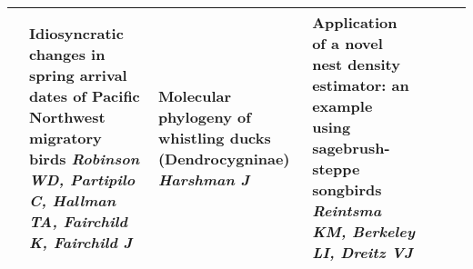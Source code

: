 \begin{tabular}{|x{0.75cm}|x{2.25cm}|x{2.25cm}|x{2.25cm}|a{2.25cm}|a{2.25cm}|a{2.25cm}|}
\hline
{}&Idiosyncratic changes in spring arrival dates of Pacific Northwest migratory birds \newline \newline \textit{Robinson WD, Partipilo C, Hallman TA, Fairchild K, Fairchild J} & Molecular phylogeny of whistling ducks (Dendrocygninae) \newline \newline \textit{Harshman J} & Application of a novel nest density estimator: an example using sagebrush-steppe songbirds \newline \newline \textit{Reintsma KM, Berkeley LI, Dreitz VJ} &  \newline \newline \textit{} &  \newline \newline \textit{} &  \newline \newline \textit{}\\
\hline
\end{tabular}
